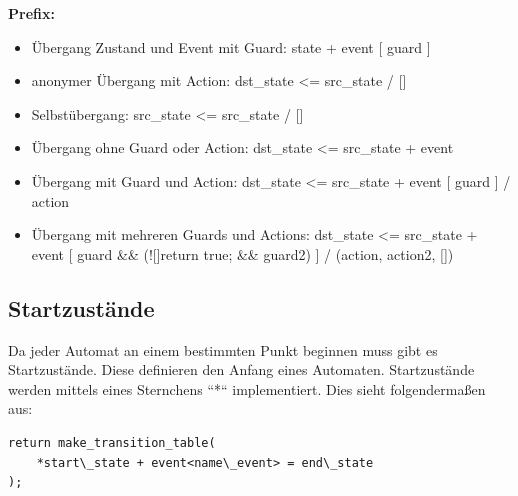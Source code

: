 \documentclass{report}
\begin{document}
\textbf{Prefix:}
\begin{itemize}
    \item Übergang Zustand und Event mit Guard: \newline state + event [ guard ]
    \item anonymer Übergang mit Action: \newline dst\_state <= src\_state / [] {}
    \item Selbstübergang: \newline src\_state <= src\_state / [] {}
    \item Übergang ohne Guard oder Action: \newline dst\_state <= src\_state + event
    \item Übergang mit Guard und Action: \newline dst\_state <= src\_state + event [ guard ] / action
    \item Übergang mit mehreren Guards und Actions: \newline dst\_state <= src\_state + event [ guard \&\& (![]{return true;} \&\& guard2) ] / (action, action2, []{})
\end{itemize}

\subsection{Startzustände}
Da jeder Automat an einem bestimmten Punkt beginnen muss gibt es Startzustände. Diese definieren den Anfang eines Automaten. Startzustände werden mittels eines Sternchens ``*`` implementiert. Dies sieht folgendermaßen aus:
\begin{lstlisting}
return make_transition_table(
    *start\_state + event<name\_event> = end\_state
);
\end{lstlisting}
\end{document}

